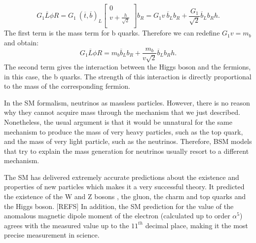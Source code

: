 \begin{equation}
	G_1 \overline{L}\phi R = G_1 ~(\overline{t}, \overline{b})_L \begin{bmatrix}
	0 \\
	v+\frac{h}{\sqrt{2}} \\
	\end{bmatrix} b_R = G_1 v ~\overline{b}_L b_R + \frac{G_1}{\sqrt{2}} \overline{b}_L b_R h.
\end{equation}
The first term is the mass term for b quarks. Therefore we can redefine $G_1 v = m_b$ and obtain:
\begin{equation}
	G_1 \overline{L}\phi R=m_b \overline{b}_L b_R + \frac{m_b}{v\sqrt{2}} \overline{b}_L b_R h.
\end{equation}
The second term gives the interaction between the Higgs boson and the fermions, in this case, the b quarks. The strength of this interaction is directly proportional to the mass of the corresponding fermion.

In the SM formalism, neutrinos as massless particles. However, there is no reason why they cannot acquire mass through the mechanism that we just described. Nonetheless, the usual argument is that it would be unnatural for the same mechanism to produce the mass of very heavy particles, such as the top quark, and the mass of very light particle, such as the neutrinos. Therefore, BSM models that try to explain the mass generation for neutrinos usually resort to a different mechanism.


The SM has delivered extremely accurate predictions about the existence and properties of new particles which makes it a very successful theory. It predicted the existence of the W and Z bosons \cite{Glashow-Weinberg-Salam}, the gluon, the charm and top quarks and the Higgs boson. [REFS] In addition, the SM prediction for the value of the anomalous magnetic dipole moment of the electron (calculated up to order $\alpha^5$) agrees with the measured value up to the $11^{th}$ decimal place, making it the most precise measurement in science.

